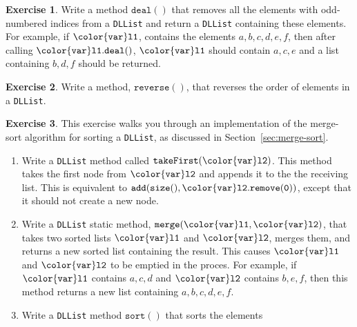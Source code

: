 \documentclass[10pt]{book}
\newcommand{\secref}[1]{Section~\ref{sec:#1}}
\theoremstyle{plain}
\theoremstyle{definition}
\newtheorem{exc}{Exercise}[chapter]
\newcommand{\exclabel}[1]{\label{exc:#1}}
\begin{document}
\begin{exc}
  Write a method \ensuremath{\mathtt{deal()}} that removes all the elements with odd-numbered
  indices from a \texttt{DLList} and return a \texttt{DLList} containing these elements.
  For example, if \ensuremath{\mathtt{{\color{var}l1}}}, contains the elements $a,b,c,d,e,f$, then after
  calling \ensuremath{\mathtt{{\color{var}l1}.deal()}}, \ensuremath{\mathtt{{\color{var}l1}}} should contain $a,c,e$ and a list containing
  $b,d,f$ should be returned.
\end{exc}

\begin{exc}
  Write a method, \ensuremath{\mathtt{reverse()}}, that reverses the order of elements in
  a \texttt{DLList}.  
\end{exc}

\begin{exc}\exclabel{dllist-sort}
  This exercise walks you through an implementation of the merge-sort
  algorithm for sorting a \texttt{DLList}, as discussed in \secref{merge-sort}.
  \begin{enumerate}
    \item Write a \texttt{DLList} method called \ensuremath{\mathtt{takeFirst({\color{var}l2})}}.
       This method takes the first node from \ensuremath{\mathtt{{\color{var}l2}}} and appends it to the the
       receiving list.  This is equivalent to \ensuremath{\mathtt{add(size(),{\color{var}l2}.remove(0))}},
       except that it should not create a new node.
    \item Write a \texttt{DLList} static method, \ensuremath{\mathtt{merge({\color{var}l1},{\color{var}l2})}}, that takes two
       sorted lists \ensuremath{\mathtt{{\color{var}l1}}} and \ensuremath{\mathtt{{\color{var}l2}}}, merges them, and returns a new sorted
       list containing the result.  This causes \ensuremath{\mathtt{{\color{var}l1}}} and \ensuremath{\mathtt{{\color{var}l2}}} to be emptied
       in the proces.  For example, if \ensuremath{\mathtt{{\color{var}l1}}} contains $a,c,d$ and \ensuremath{\mathtt{{\color{var}l2}}} contains
       $b,e,f$, then this method returns a new list containing $a,b,c,d,e,f$.
    \item Write a \texttt{DLList} method \ensuremath{\mathtt{sort()}} that sorts the elements

\end{enumerate}
\end{exc}
\end{document}
